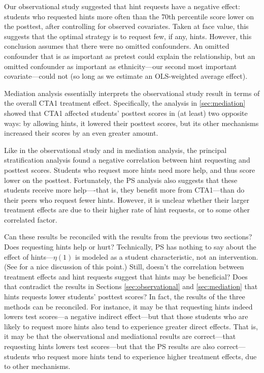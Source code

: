 \documentclass{article}\usepackage[]{graphicx}\usepackage[]{color}
\begin{document}
Our observational study suggested that hint requests have a negative effect: students who
requested hints more often than the 70th
percentile score lower on the posttest, after controlling for observed
covariates.
Taken at face value, this suggests that the optimal strategy is to request few, if any, hints.
However, this conclusion assumes that there were no omitted confounders.
An omitted confounder that is as important as pretest could explain the relationship, but an omitted confounder as important as ethnicity---our second most important covariate---could not (so long as we estimate an OLS-weighted average effect).

Mediation analysis essentially interprets the observational study result in terms of the
overall CTA1 treatment effect.
Specifically, the analysis in \ref{sec:mediation} showed that CTA1 affected students'
posttest scores in (at least) two opposite ways: by allowing hints, it
lowered their posttest scores, but its other mechanisms increased
their scores by an even greater amount.

Like in the observational study and in mediation analysis, the
principal stratification analysis found a negative correlation
between hint requesting and posttest scores.
Students who request more hints need more help, and thus score lower
on the posttest.
Fortunately, the PS analysis also suggests that these students
receive more help----that is, they benefit more from CTA1---than do their peers who request fewer hints.
However, it is unclear whether their larger treatment effects are due to their higher rate of hint requests, or to some other correlated factor.

Can these results be reconciled with the results from the previous two
sections?
Does requesting hints help or hurt?
Technically, PS has nothing to say about the effect of hints---$\eta(1)$
is modeled as a student characteristic, not an intervention.
(See \citealt{jin2008principal} for a nice discussion of this point.)
Still, doesn't the correlation between treatment effects and hint
requests suggest that hints may be beneficial?
Does that contradict the results in Sections \ref{sec:observational}
and \ref{sec:mediation} that hints requests lower students' posttest
scores?
In fact, the results of the three methods can be reconciled.
For instance, it may be that requesting hints indeed lowers test
scores---a negative indirect effect---but that those students who are
likely to request more hints also tend to experience greater direct
effects.
That is, it may be that the observational and mediational results are
correct---that requesting hints lowers test scores---but that the PS
results are also correct---students who request more hints tend to
experience higher treatment effects, due to other mechanisms.
\end{document}
